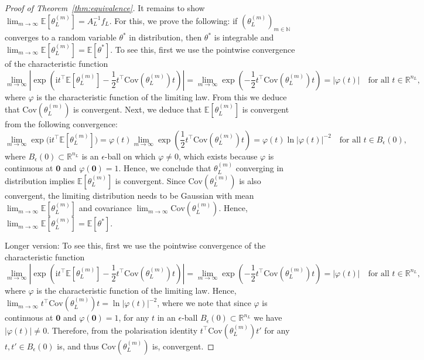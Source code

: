 \documentclass[11pt,english]{article}
\theoremstyle{plain}
\theoremstyle{plain}
\theoremstyle{plain}
\theoremstyle{plain}
\numberwithin{equation}{section}
\begin{document}
\begin{proof}[Proof of Theorem~\ref{thm:equivalence}]
	It remains to show $\lim_{m\to\infty}\mathbb{E}[\theta_{L}^{(m)}]=A_L^{-1}f_L$.
	For this, we prove the following: if $(\theta_{L}^{(m)})_{m\in\mathbb{N}}$ converges to a random variable $\theta^{*}$
	in distribution, then $\theta^{*}$ is integrable
	and $\lim_{m\to\infty}\mathbb{E}[\theta_{L}^{(m)}]=\mathbb{E}[\theta^{*}]$.
	To see this, first we use the pointwise convergence of the characteristic
	function
	\[
		\lim_{m\to\infty}\left|\exp\left(\mathrm{i}t^{\top}\mathbb{E}[\theta_{L}^{(m)}]-\frac{1}{2}t^{\top}\mathrm{Cov}(\theta_{L}^{(m)})t\right)\right|=\lim_{m\to\infty}\exp\left(-\frac{1}{2}t^{\top}\mathrm{Cov}(\theta_{L}^{(m)})t\right)=|\varphi(t)|\quad\text{for all }t\in\mathbb{R}^{n_{L}},
	\]
	where $\varphi$ is the characteristic function of the limiting law. From this we deduce that $\mathrm{Cov}(\theta_{L}^{(m)})$ is convergent.
	Next, we deduce that $\mathbb{E}[\theta_{L}^{(m)}]$ is convergent from the following convergence:
	\begin{equation}
		\lim_{m\to\infty}\exp\bigl(\mathrm{i}t^{\top}\mathbb{E}[\theta_{L}^{(m)}]\bigr)=\varphi(t)\lim_{m\to\infty}\exp\left(\frac{1}{2}t^{\top}\mathrm{Cov}(\theta_{L}^{(m)})t\right)=\varphi(t)\ln|\varphi(t)|^{-2}\quad\text{for all }t\in B_{\epsilon}(0),%
	\end{equation}
	where 	$B_{\epsilon}(0)\subset\mathbb{R}^{n_{L}}$ is an $\epsilon$-ball on which $\varphi\neq 0$, which exists because $\varphi$ is continuous at $\boldsymbol{0}$
	and $\varphi(\boldsymbol{0})=1$.
	Hence, we conclude that $\theta_{L}^{(m)}$
	converging in distribution implies  $\mathbb{E}[\theta_{L}^{(m)}]$
	is convergent. Since $\mathrm{Cov}(\theta_{L}^{(m)})$ is also convergent,
	the limiting distribution needs to be Gaussian with mean $\lim_{m\to\infty}\mathbb{E}[\theta_{L}^{(m)}]$
	and covariance $\lim_{m\to\infty}\mathrm{Cov}(\theta_{L}^{(m)})$.
	Hence, $\lim_{m\to\infty}\mathbb{E}[\theta_{L}^{(m)}]=\mathbb{E}[\theta^{*}]$.

	\iffalse
		Longer version:
		To see this, first we use the pointwise convergence of the characteristic
		function
		\[
			\lim_{m\to\infty}\left|\exp\left(\mathrm{i}t^{\top}\mathbb{E}[\theta_{L}^{(m)}]-\frac{1}{2}t^{\top}\mathrm{Cov}(\theta_{L}^{(m)})t\right)\right|=\lim_{m\to\infty}\exp\left(-\frac{1}{2}t^{\top}\mathrm{Cov}(\theta_{L}^{(m)})t\right)=|\varphi(t)|\quad\text{for all }t\in\mathbb{R}^{n_{L}},
		\]
		where $\varphi$ is the characteristic function of the limiting law.
		Hence, $\lim_{m\to\infty}t^{\top}\mathrm{Cov}(\theta_{L}^{(m)})t=\ln|\varphi(t)|^{-2}$,
		where we note that since $\varphi$ is continuous at $\boldsymbol{0}$
		and $\varphi(\boldsymbol{0})=1$, for any $t$ in an $\epsilon$-ball
		$B_{\epsilon}(0)\subset\mathbb{R}^{n_{L}}$ we have $|\varphi(t)|\neq0$.
		Therefore, from the polarisation identity $t^{\top}\mathrm{Cov}(\theta_{L}^{(m)})t'$
		for any $t,t'\in B_{\epsilon}(0)$ is, and thus
		$\mathrm{Cov}(\theta_{L}^{(m)})$ is, convergent.


\end{proof}
\end{document}
